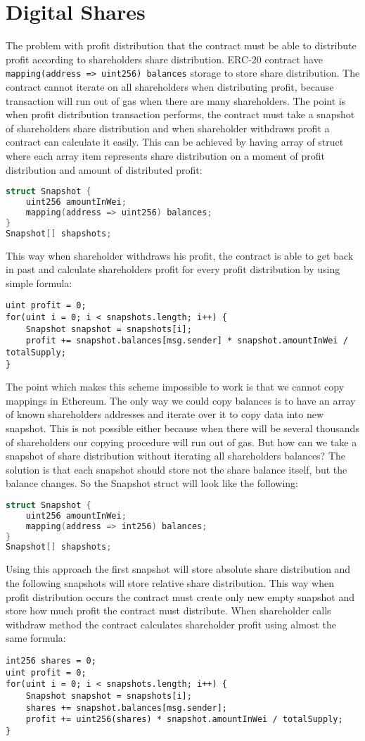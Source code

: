 \documentclass[onecolumn]{article}
\begin{document}
\section{Digital Shares}
The problem with profit distribution that the contract must be able to distribute profit according to shareholders share distribution. ERC-20 contract have \lstinline{mapping(address => uint256) balances} storage to store share distribution. The contract cannot iterate on all shareholders when distributing profit, because transaction will run out of gas when there are many shareholders. The point is when profit distribution transaction performs, the contract must take a snapshot of shareholders share distribution and when shareholder withdraws profit a contract can calculate it easily. This can be achieved by having array of struct where each array item represents share distribution on a moment of profit distribution and amount of distributed profit:
\begin{lstlisting}[language=C]
struct Snapshot {
	uint256 amountInWei;
	mapping(address => uint256) balances;
}
Snapshot[] shapshots;
\end{lstlisting}
This way when shareholder withdraws his profit, the contract is able to get back in past and calculate shareholders profit for every profit distribution by using simple formula:
\begin{lstlisting}
uint profit = 0;
for(uint i = 0; i < snapshots.length; i++) {
	Snapshot snapshot = snapshots[i];
	profit += snapshot.balances[msg.sender] * snapshot.amountInWei / totalSupply;
}
\end{lstlisting}
The point which makes this scheme impossible to work is that we cannot copy mappings in Ethereum. The only way we could copy balances is to have an array of known shareholders addresses and iterate over it to copy data into new snapshot. This is not possible either because when there will be several thousands of shareholders our copying procedure will run out of gas. But how can we take a snapshot of share distribution without iterating all shareholders balances? The solution is that each snapshot should store not the share balance itself, but the balance changes. So the Snapshot struct will look like the following:
\begin{lstlisting}[language=C]
struct Snapshot {
	uint256 amountInWei;
	mapping(address => int256) balances;
}
Snapshot[] shapshots;
\end{lstlisting}
Using this approach the first snapshot will store absolute share distribution and the following snapshots will store relative share distribution. This way when profit distribution occurs the contract must create only new empty snapshot and store how much profit the contract must distribute. When shareholder calls withdraw method the contract calculates shareholder profit using almost the same formula:
\begin{lstlisting}
int256 shares = 0;
uint profit = 0;
for(uint i = 0; i < snapshots.length; i++) {
	Snapshot snapshot = snapshots[i];
	shares += snapshot.balances[msg.sender];
	profit += uint256(shares) * snapshot.amountInWei / totalSupply;
}
\end{lstlisting}
\end{document}
